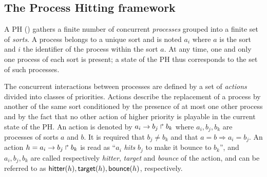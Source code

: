 \subsection{The Process Hitting framework}
\label{ssec:PH}


A PH () gathers a finite number of concurrent \emph{processes} grouped into a finite set of \emph{sorts}.
A process belongs to a unique sort and is noted $a_i$ where $a$ is the sort and $i$ the identifier of the process within the sort $a$.
At any time, one and only one process of each sort is present; a state of the PH thus corresponds to the set of such processes.

The concurrent interactions between processes are defined by a set of \emph{actions} divided into classes of priorities.
Actions describe the replacement of a process by another of the same sort conditioned by the presence of at most one other process and by the fact that no other action of higher priority is playable in the current state of the PH.
An action is denoted by $a_i\rightarrow b_j\Rsh b_k$ where $a_i,b_j,b_k$ are processes of sorts $a$ and $b$.
It is required that $b_j \neq b_k$ and that $a=b\Rightarrow a_i=b_j$.
An action $h=a_i\rightarrow b_j\Rsh b_k$ is read as ``$a_i$ \emph{hits} $b_j$ to make it bounce to $b_k$'', and $a_i,b_j,b_k$ are called respectively \emph{hitter}, \emph{target} and \emph{bounce} of the action, and can be referred to as $\mathsf{hitter}(h), \mathsf{target}(h), \mathsf{bounce}(h)$, respectively.

\begin{comment}
\begin{definition}[Process Hitting]\label{def:PH}
A \emph{Process Hitting} is a triple $(\PHs,\PHl,\PHa)$:
\begin{itemize}
\item $\PHs \DEF \{a,b,\dots\}$ is the finite set of \emph{sorts};
\item $\PHl \DEF \prod_{a\in\PHs} \PHl_a$ is the set of states with $\PHl_a = \{a_0,\dots,a_{l_a}\}$
the finite set of \emph{processes} of sort $a\in\Sigma$ and $l_a$ a positive integer with
	$a\neq b\Rightarrow \forall(a_i,b_j)\in\PHl_a\times\PHl_b,a_i\neq b_j$;
\item $\PHa \DEF \{ \PHfrappe{a_i}{b_j}{b_k}, \dots \mid
					(a,b)\in\PHs^2 \wedge (a_i,b_j,b_k)\in \PHl_a\times\PHl_b\times\PHl_b$ \\
	\hspace*{2cm} $\wedge b_j\neq b_k \wedge a=b\Rightarrow a_i=b_j\}$
			is the finite set of \emph{actions}.
\end{itemize}
$\PHproc$ denotes the set of all processes ($\PHproc \DEF \{ a_i\mid a\in\PHs \wedge a_i\in\PHl_a\}$).
\end{definition}
\end{comment}

